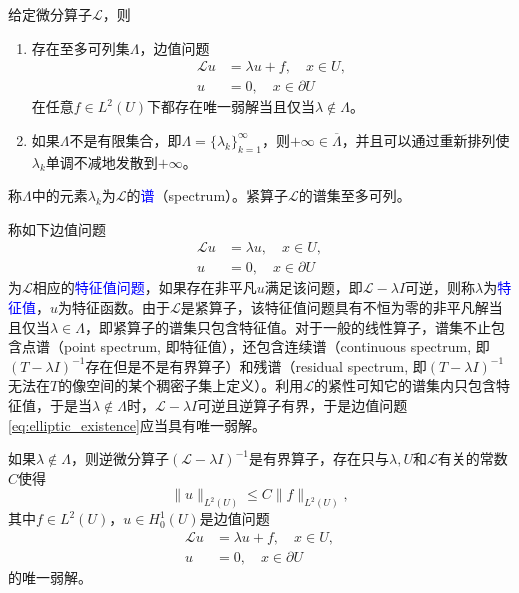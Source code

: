 \documentclass[a4paper,10pt]{ctexart}
\begin{document}
\begin{theorem}
    给定微分算子$ \mathcal{L} $，则
    \begin{enumerate}
        \item 存在至多可列集$ \Lambda $，边值问题
        \begin{equation}
            \begin{aligned}
                \mathcal{L}u &= \lambda u + f, \quad x\in U,\\
                u &= 0, \quad x\in \partial U
            \end{aligned}
        \end{equation}
        在任意$ f\in L^2(U) $下都存在唯一弱解当且仅当$ \lambda \notin \Lambda $。
        \item 如果$ \Lambda $不是有限集合，即$ \Lambda = \{\lambda_k\}_{k=1}^\infty $，则$ +\infty \in \overline{\Lambda} $，并且可以通过重新排列使$ \lambda_k $单调不减地发散到$ +\infty $。
    \end{enumerate}
    称$ \Lambda $中的元素$ \lambda_k $为$ \mathcal{L} $的\textcolor{blue}{谱}（spectrum）。紧算子$ \mathcal{L} $的谱集至多可列。
\end{theorem}
称如下边值问题
\[
    \begin{aligned}
        \mathcal{L}u &= \lambda u, \quad x\in U,\\
        u &= 0, \quad x\in \partial U
    \end{aligned}
\]
为$ \mathcal{L} $相应的\textcolor{blue}{特征值问题}，如果存在非平凡$ u $满足该问题，即$ \mathcal{L} - \lambda I $可逆，则称$ \lambda $为\textcolor{blue}{特征值}，$ u $为特征函数。由于$ \mathcal{L} $是紧算子，该特征值问题具有不恒为零的非平凡解当且仅当$ \lambda \in \Lambda $，即紧算子的谱集只包含特征值。对于一般的线性算子，谱集不止包含点谱（point spectrum, 即特征值），还包含连续谱（continuous spectrum, 即$ (T-\lambda I)^{-1} $存在但是不是有界算子）和残谱（residual spectrum, 即$ (T-\lambda I)^{-1} $无法在$ T $的像空间的某个稠密子集上定义）。利用$ \mathcal{L} $的紧性可知它的谱集内只包含特征值，于是当$ \lambda\notin \Lambda $时，$ \mathcal{L} - \lambda I $可逆且逆算子有界，于是边值问题\eqref{eq:elliptic_existence}应当具有唯一弱解。
\begin{theorem}
    如果$ \lambda\notin \Lambda $，则逆微分算子$ (\mathcal{L}-\lambda I)^{-1} $是有界算子，存在只与$ \lambda,U $和$ \mathcal{L} $有关的常数$ C $使得
    \begin{equation}
        \| u \|_{L^2(U)} \leqslant  C \| f \|_{L^2(U)},
    \end{equation}
    其中$ f\in L^2(U) $，$ u\in H^1_0(U) $是边值问题
    \begin{equation}
        \begin{aligned}
            \mathcal{L}u &= \lambda u + f, \quad x\in U,\\
            u &= 0, \quad x\in \partial U
        \end{aligned}
    \end{equation}
    的唯一弱解。
\end{theorem}
\end{document}

